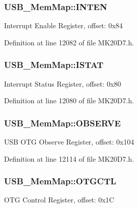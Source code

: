 \subsubsection[{\texorpdfstring{I\+N\+T\+EN}{INTEN}}]{ U\+S\+B\+\_\+\+Mem\+Map\+::\+I\+N\+T\+EN}\hypertarget{struct_u_s_b___mem_map_aa19462850c5085330e53ed19397f6e1e}{}\label{struct_u_s_b___mem_map_aa19462850c5085330e53ed19397f6e1e}
Interrupt Enable Register, offset\+: 0x84 

Definition at line 12082 of file M\+K20\+D7.\+h.

\subsubsection[{\texorpdfstring{I\+S\+T\+AT}{ISTAT}}]{ U\+S\+B\+\_\+\+Mem\+Map\+::\+I\+S\+T\+AT}\hypertarget{struct_u_s_b___mem_map_aa88345921ba963631cba089504b96c19}{}\label{struct_u_s_b___mem_map_aa88345921ba963631cba089504b96c19}
Interrupt Status Register, offset\+: 0x80 

Definition at line 12080 of file M\+K20\+D7.\+h.

\subsubsection[{\texorpdfstring{O\+B\+S\+E\+R\+VE}{OBSERVE}}]{ U\+S\+B\+\_\+\+Mem\+Map\+::\+O\+B\+S\+E\+R\+VE}\hypertarget{struct_u_s_b___mem_map_a1bf837fd42e907a712c9f8e7261ea10d}{}\label{struct_u_s_b___mem_map_a1bf837fd42e907a712c9f8e7261ea10d}
U\+SB O\+TG Observe Register, offset\+: 0x104 

Definition at line 12114 of file M\+K20\+D7.\+h.

\subsubsection[{\texorpdfstring{O\+T\+G\+C\+TL}{OTGCTL}}]{ U\+S\+B\+\_\+\+Mem\+Map\+::\+O\+T\+G\+C\+TL}\hypertarget{struct_u_s_b___mem_map_a615eaa9b0200d66323e8ee2650a49164}{}\label{struct_u_s_b___mem_map_a615eaa9b0200d66323e8ee2650a49164}
O\+TG Control Register, offset\+: 0x1C 

